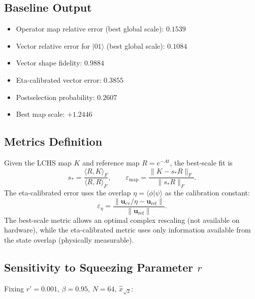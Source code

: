 \documentclass[11pt]{article}
\begin{document}
\subsection{Baseline Output}

\begin{itemize}[itemsep=2pt]
  \item Operator map relative error (best global scale): $0.1539$
  \item Vector relative error for $|01\rangle$ (best global scale): $0.1084$
  \item Vector shape fidelity: $0.9884$
  \item Eta-calibrated vector error: $0.3855$
  \item Postselection probability: $0.2607$
  \item Best map scale: $+1.2446$
\end{itemize}

\subsection{Metrics Definition}

Given the LCHS map $K$ and reference map $R = e^{-At}$, the best-scale fit is
\begin{equation}
  s_* = \frac{\langle R, K\rangle_F}{\langle R, R\rangle_F},
  \qquad
  \varepsilon_{\text{map}} = \frac{\|K - s_* R\|_F}{\|s_* R\|_F}.
\end{equation}
The eta-calibrated error uses the overlap $\eta = \langle\phi|\psi\rangle$
as the calibration constant:
\begin{equation}
  \varepsilon_{\eta} = \frac{\|\mathbf{u}_{\text{cv}}/\eta - \mathbf{u}_{\text{ref}}\|}
                            {\|\mathbf{u}_{\text{ref}}\|}.
\end{equation}
The best-scale metric allows an optimal complex rescaling (not available on
hardware), while the eta-calibrated metric uses only information available
from the state overlap (physically measurable).

\subsection{Sensitivity to Squeezing Parameter $r$}

Fixing $r' = 0.001$, $\beta = 0.95$, $N = 64$, $\hat{x}_{\sqrt{2}}$:
\end{document}
